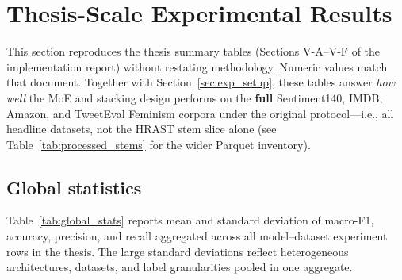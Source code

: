 \section{Thesis-Scale Experimental Results}
\label{sec:thesis_results}

This section reproduces the thesis summary tables (Sections V-A--V-F of the implementation report) without restating methodology. Numeric values match that document. Together with Section~\ref{sec:exp_setup}, these tables answer \emph{how well} the MoE and stacking design performs on the \textbf{full} Sentiment140, IMDB, Amazon, and TweetEval Feminism corpora under the original protocol---i.e., all headline datasets, not the HRAST stem slice alone (see Table~\ref{tab:processed_stems} for the wider Parquet inventory).

\subsection{Global statistics}
Table~\ref{tab:global_stats} reports mean and standard deviation of macro-F1, accuracy, precision, and recall aggregated across all model--dataset experiment rows in the thesis. The large standard deviations reflect heterogeneous architectures, datasets, and label granularities pooled in one aggregate.

